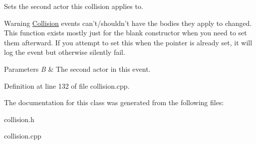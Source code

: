 Sets the second actor this collision applies to. 

\begin{DoxyWarning}{Warning}
\hyperlink{classMezzanine_1_1Collision}{Collision} events can't/shouldn't have the bodies they apply to changed. This function exists mostly just for the blank constructor when you need to set them afterward. If you attempt to set this when the pointer is already set, it will log the event but otherwise silently fail. 
\end{DoxyWarning}

\begin{DoxyParams}{Parameters}
{\em B} & The second actor in this event. \\
\hline
\end{DoxyParams}


Definition at line 132 of file collision.cpp.



The documentation for this class was generated from the following files:\begin{DoxyCompactItemize}
\item 
collision.h\item 
collision.cpp\end{DoxyCompactItemize}
